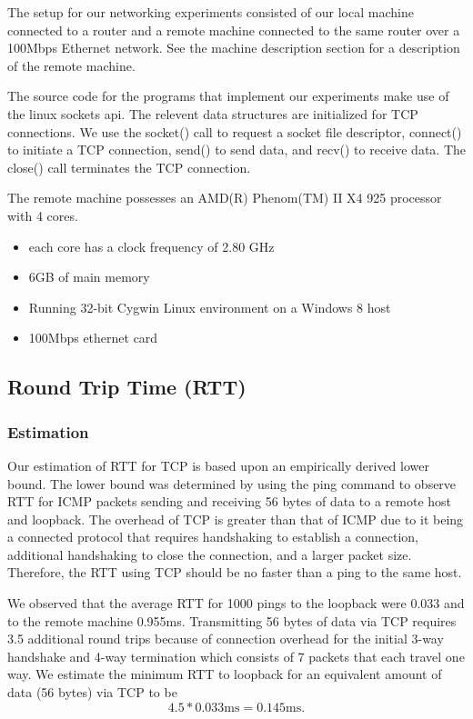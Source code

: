 The setup for our networking experiments consisted of our local machine
connected to a router and a remote machine connected to the same router over a
100Mbps Ethernet network. See the machine description section for a description
of the remote machine.

The source code for the programs that implement our experiments make use of the
linux sockets api. The relevent data structures are initialized for TCP connections.
We use the socket() call to request a socket file descriptor,
connect() to initiate a TCP connection, send() to send data, and recv() to receive
 data. The close() call terminates the TCP connection.

 The remote machine possesses an AMD(R) Phenom(TM) II X4 925 processor with 4 cores.
 \begin{itemize}
     \item{each core has a clock frequency of 2.80 GHz}
     \item{6GB of main memory}
     \item{Running 32-bit Cygwin Linux environment on a Windows 8 host}
     \item{100Mbps ethernet card}
 \end{itemize}

\subsection{Round Trip Time (RTT)}

\subsubsection{Estimation}

Our estimation of RTT for TCP is based upon an empirically derived lower bound.
The lower bound was determined by using the ping command to observe RTT for
ICMP packets sending and receiving 56 bytes of data to a remote host and
loopback. The overhead of TCP is greater than that of ICMP due to it being a
connected protocol that requires handshaking to establish a connection,
additional handshaking to close the connection, and a larger packet size.
Therefore, the RTT using TCP should be no faster than a ping to the same host. 

We observed that the average RTT for 1000 pings to the loopback were 0.033 and
to the remote machine 0.955ms. Transmitting 56 bytes of data via TCP requires
3.5 additional round trips because of connection overhead for the initial 3-way
handshake and 4-way termination which consists of 7 packets that each travel
one way.  We estimate the minimum RTT to loopback for an equivalent amount of
data (56 bytes) via TCP to be $$4.5 * 0.033\text{ms} = 0.145\text{ms}.$$  

